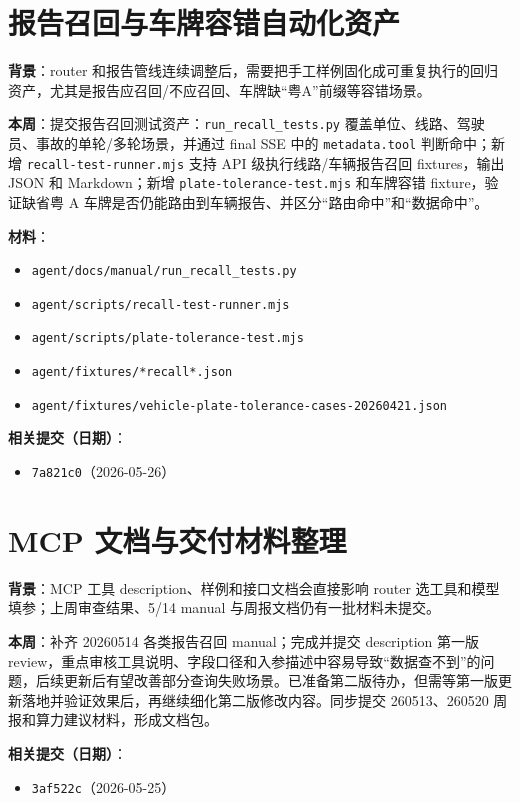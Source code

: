 \documentclass[UTF8]{ctexart}
\begin{document}
\section{报告召回与车牌容错自动化资产}

\textbf{背景}：router 和报告管线连续调整后，需要把手工样例固化成可重复执行的回归资产，尤其是报告应召回/不应召回、车牌缺“粤A”前缀等容错场景。

\textbf{本周}：提交报告召回测试资产：\texttt{run\_recall\_tests.py} 覆盖单位、线路、驾驶员、事故的单轮/多轮场景，并通过 final SSE 中的 \texttt{metadata.tool} 判断命中；新增 \texttt{recall-test-runner.mjs} 支持 API 级执行线路/车辆报告召回 fixtures，输出 JSON 和 Markdown；新增 \texttt{plate-tolerance-test.mjs} 和车牌容错 fixture，验证缺省粤 A 车牌是否仍能路由到车辆报告、并区分“路由命中”和“数据命中”。

\textbf{材料}：
\begin{itemize}
\item \texttt{agent/docs/manual/run\_recall\_tests.py}
\item \texttt{agent/scripts/recall-test-runner.mjs}
\item \texttt{agent/scripts/plate-tolerance-test.mjs}
\item \texttt{agent/fixtures/*recall*.json}
\item \texttt{agent/fixtures/vehicle-plate-tolerance-cases-20260421.json}
\end{itemize}

\textbf{相关提交（日期）}：
\begin{itemize}
\item \texttt{7a821c0}（2026-05-26）
\end{itemize}

\section{MCP 文档与交付材料整理}

\textbf{背景}：MCP 工具 description、样例和接口文档会直接影响 router 选工具和模型填参；上周审查结果、5/14 manual 与周报文档仍有一批材料未提交。

\textbf{本周}：补齐 20260514 各类报告召回 manual；完成并提交 description 第一版 review，重点审核工具说明、字段口径和入参描述中容易导致“数据查不到”的问题，后续更新后有望改善部分查询失败场景。已准备第二版待办，但需等第一版更新落地并验证效果后，再继续细化第二版修改内容。同步提交 260513、260520 周报和算力建议材料，形成文档包。

\textbf{相关提交（日期）}：
\begin{itemize}
\item \texttt{3af522c}（2026-05-25）
\end{itemize}
\end{document}
